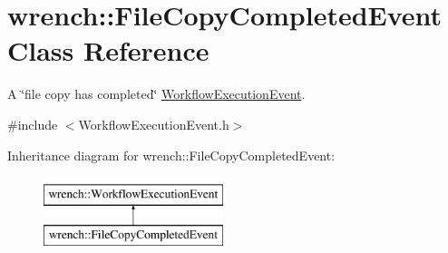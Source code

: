 \hypertarget{classwrench_1_1_file_copy_completed_event}{}\section{wrench\+:\+:File\+Copy\+Completed\+Event Class Reference}
\label{classwrench_1_1_file_copy_completed_event}


A \char`\"{}file copy has completed\char`\"{} \hyperlink{classwrench_1_1_workflow_execution_event}{Workflow\+Execution\+Event}.  




{\ttfamily \#include $<$Workflow\+Execution\+Event.\+h$>$}

Inheritance diagram for wrench\+:\+:File\+Copy\+Completed\+Event\+:\begin{figure}[H]
\begin{center}
\leavevmode
\includegraphics[height=2.000000cm]{classwrench_1_1_file_copy_completed_event}
\end{center}
\end{figure}
